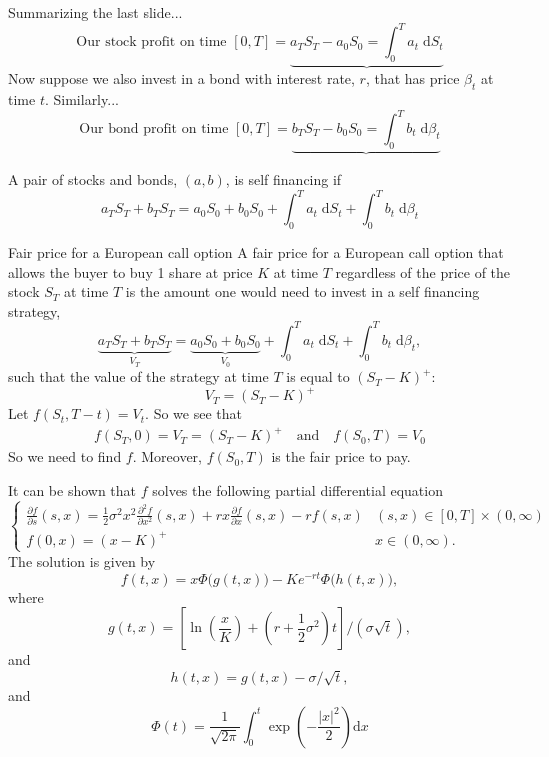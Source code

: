\documentclass{beamer}%
\numberwithin{equation}{section}
\newcommand{\ud}{\ensuremath{\mathrm{d} }}
\begin{document}
\begin{frame}
	Summarizing the last slide...
		\[ 
			\text{Our stock profit on time $[0,T]$} = \underbrace{a_TS_T - a_0S_0  =  \int_0^T a_t \; \ud S_t }
		\]
	Now suppose we also invest in a bond with interest rate, $r$, that has price $\beta_t$ at time $t$. Similarly...
		\[
			\text{Our bond profit on time $[0,T]$} = \underbrace{b_TS_T - b_0S_0  =  \int_0^T b_t \; \ud \beta_t} 
		\]
	\begin{definition}
	A pair of stocks and bonds, $(a,b)$, is self financing if 
		\[
			a_TS_T + b_TS_T = a_0S_0 + b_0S_0 +  \int_0^T a_t \; \ud S_t + \int_0^T b_t \; \ud \beta_t 
		\]
	\end{definition}
\end{frame}

\begin{frame}{Fair price for a European call option}
	A fair price for a European call option that allows the buyer to buy 1 share at price $K$ at time $T$ regardless of the price of the stock $S_T$ at time $T$ is the amount one would need to invest in a self financing strategy,
		\[
			\underbrace{a_TS_T + b_TS_T}_{V_T} = \underbrace{a_0S_0 + b_0S_0}_{V_0} +  \int_0^T a_t \; \ud S_t + \int_0^T b_t \; \ud \beta_t ,
		\]
	such that the value of the strategy at time $T$ is equal to $(S_T - K)^+$:
		\[
				V_T = (S_T - K)^+
		\]
	Let $f(S_t, T-t) = V_t$. So we see that
	 \begin{align*}
	 f(S_T, 0) = V_T = (S_T - K)^+ \quad \text{and} \quad  f(S_0, T) =V_0
	 \end{align*}
	So we need to find $f$. Moreover, $f(S_0, T)$ is the fair price to pay. 
	\end{frame}

	\begin{frame}
It can be shown that $f$ solves the following partial differential equation 
	\[
		\begin{cases}
			\frac{\partial f}{\partial s}(s, x) = \frac{1}{2} \sigma^2 x^2 \frac{\partial^2f}{\partial x^2}(s,x) + rx\frac{\partial f}{\partial x}(s,x) - r f(s,x) & (s,x) \in [0,T] \times (0,\infty) \\
			f(0,x) = (x-K)^+ & x \in (0,\infty).
		\end{cases}
	\]
The solution is given by 
	\[
		f(t,x) = x \Phi\big(g(t,x)\big) - K e^{-rt}\Phi\big( h(t,x) \big),
	\]
where
	\[
		g(t,x) = \left[ \ln\left(\frac{x}{K}\right) + \left(r  +\frac{1}{2} \sigma^2\right) t \right] / (\sigma \sqrt{t}),
	\]
and
	\[
		h(t,x) = g(t,x) - \sigma / \sqrt{t},
	\]
and
	\[
		\Phi(t) = \frac{1}{\sqrt{2\pi}}\int_0^t \exp\left(-\frac{|x|^2}{2}\right) \ud x
	\]
	\end{frame}
\end{document}
